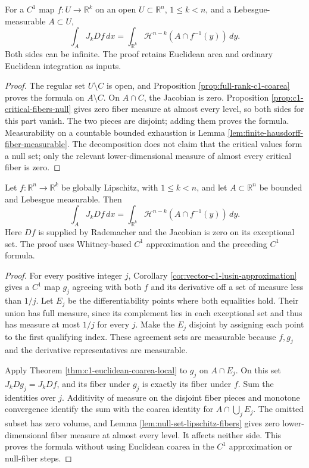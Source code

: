 \begin{theorem}\label{thm:c1-euclidean-coarea-local}
For a $C^1$ map $f:U\to\mathbb R^k$ on an open $U\subset\mathbb R^n$, $1\leq k<n$, and a Lebesgue-measurable $A\subset U$,
\[
 \int_AJ_kDf\,dx=\int_{\mathbb R^k}\mathcal H^{n-k}(A\cap f^{-1}(y))\,dy.
\]
Both sides can be infinite. The proof retains Euclidean area and ordinary Euclidean integration as inputs.
\end{theorem}
\begin{proof}
The regular set $U\setminus C$ is open, and Proposition \ref{prop:full-rank-c1-coarea} proves the formula on $A\setminus C$. On $A\cap C$, the Jacobian is zero. Proposition \ref{prop:c1-critical-fibers-null} gives zero fiber measure at almost every level, so both sides for this part vanish. The two pieces are disjoint; adding them proves the formula. Measurability on a countable bounded exhaustion is Lemma \ref{lem:finite-hausdorff-fiber-measurable}. The decomposition does not claim that the critical values form a null set; only the relevant lower-dimensional measure of almost every critical fiber is zero.
\end{proof}

\begin{proposition}\label{prop:lipschitz-coarea-c1-reduction}
Let $f:\mathbb R^n\to\mathbb R^k$ be globally Lipschitz, with $1\leq k<n$, and let $A\subset\mathbb R^n$ be bounded and Lebesgue measurable. Then
\[
 \int_AJ_kDf\,dx=\int_{\mathbb R^k}\mathcal H^{n-k}(A\cap f^{-1}(y))\,dy.
\]
Here $Df$ is supplied by Rademacher and the Jacobian is zero on its exceptional set. The proof uses Whitney-based $C^1$ approximation and the preceding $C^1$ formula.
\end{proposition}
\begin{proof}
For every positive integer $j$, Corollary \ref{cor:vector-c1-lusin-approximation} gives a $C^1$ map $g_j$ agreeing with both $f$ and its derivative off a set of measure less than $1/j$. Let $E_j$ be the differentiability points where both equalities hold. Their union has full measure, since its complement lies in each exceptional set and thus has measure at most $1/j$ for every $j$. Make the $E_j$ disjoint by assigning each point to the first qualifying index. These agreement sets are measurable because $f,g_j$ and the derivative representatives are measurable.

Apply Theorem \ref{thm:c1-euclidean-coarea-local} to $g_j$ on $A\cap E_j$. On this set $J_kDg_j=J_kDf$, and its fiber under $g_j$ is exactly its fiber under $f$. Sum the identities over $j$. Additivity of measure on the disjoint fiber pieces and monotone convergence identify the sum with the coarea identity for $A\cap\bigcup_jE_j$. The omitted subset has zero volume, and Lemma \ref{lem:null-set-lipschitz-fibers} gives zero lower-dimensional fiber measure at almost every level. It affects neither side. This proves the formula without using Euclidean coarea in the $C^1$ approximation or null-fiber steps.
\end{proof}
